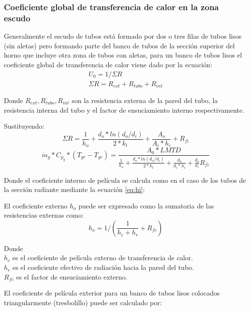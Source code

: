 \subsubsection{Coeficiente global de transferencia de calor en la zona escudo}
\par Generalmente el escudo de tubos está formado por dos o tres filas de tubos lisos (sin aletas) pero formando parte del banco de tubos de la sección superior del horno que incluye otra zona de tubos con aletas, para un banco de tubos lisos el coeficiente global de transferencia de calor viene dado por la ecuación:
\begin{gather*}
\label{}
U_0  = 1 / \Sigma R \\
\Sigma R = R_{ext} + R_{tubo} + R_{int}
\end{gather*}
\par Donde $R_{ext}, R_{tubo}, R_{int}$ son la resistencia externa de la pared del tubo, la resistencia interna del tubo y el factor de ensuciamiento interno respectivamente.
\par Sustituyendo:
\begin{equation}
\label{}
\Sigma R = \frac{1}{h_o} +\frac{d_o*ln(d_o/d_i)}{2*k_t} +\frac{A_o}{A_i*h_i} +R_{fi}
\end{equation}
\begin{equation}
\label{}
\dot m_{g} *C_{p_g} *(T_{gr} - T_{ge}) = \frac{A_0 *LMTD}
{\frac{1}{h_o} +\frac{d_o*ln(d_o/d_i)}{2*k_t} +\frac{d_o}{d_i*h_i} +\frac{d_o}{d_i}R_{fi}}
\end{equation}
\par Donde el coeficiente interno de película se calcula como en el caso de los tubos de la sección radiante mediante la ecuación \ref{eq:hi}:
\par El coeficiente externo $h_o$ puede ser expresado como la sumatoria de las resistencias externas como:
\begin{equation}
\label{eq:ho}
h_o = 1/(\frac{1}{h_c + h_{r}} + R_{fe})
\end{equation}
\par Donde \\
$h_c$ es el coeficiente de película externo de transferencia de calor.\\
$h_r$ es el coeficiente efectivo de radiación hacia la pared del tubo.\\
$R_{fe}$ es el factor de ensuciamiento externo.\\
\par El coeficiente de película exterior para un banco de tubos lisos colocados triangularmente (tresbolillo) puede ser calculado por:

